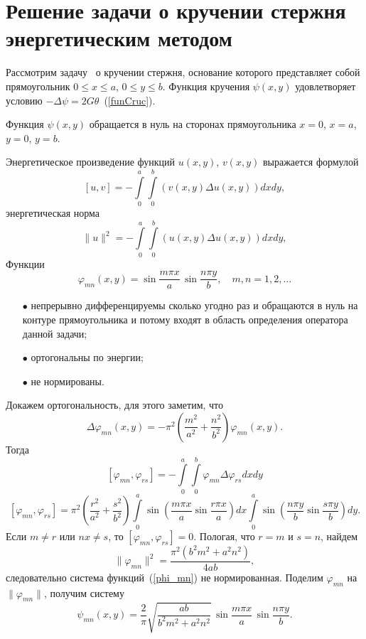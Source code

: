 \documentclass[12pt, a4paper]{article}
\begin{document}
\section{Решение задачи о кручении стержня энергетическим методом}
Рассмотрим задачу~\cite{Michilin} о кручении стержня, основание которого представляет собой   прямоугольник
$0 \leqslant x \leqslant a$, $0 \leqslant y \leqslant b$.
Функция кручения $\psi(x, y)$ удовлетворяет условию $-\Delta \psi = 2 G \theta$~(\ref{funCruc}).

Функция $\psi(x, y)$ обращается в нуль на
сторонах прямоугольника $x= 0$, $x = a$, $y = 0$, $y = b$.

Энергетическое произведение функций $u(x, y)$, $v(x, y)$ выражается формулой
\begin{equation}  
	\label{multUV}
	[\textit{u}, \textit{v}] = - \int\limits_0^a \int\limits_0^b \left(v(x, y) \Delta u(x, y ) \right) dx dy,
\end{equation}
энергетическая норма
\begin{equation}  
	\label{energoNorm}
	\|u\|^2 = - \int\limits_0^a \int\limits_0^b \left(u(x, y) \Delta u(x, y ) \right) dx dy,
\end{equation}
Функции
\begin{equation}  
	\label{phi_mn}
	\varphi_{mn}(x, y) = \sin\frac{m\pi x}{a} \, \sin\frac{n\pi y}{b}, \quad
	m, n = 1, 2, \ldots
\end{equation}

\begin{itemize}
	\item [$\bullet$] непрерывно дифференцируемы сколько угодно раз и
	обращаются в нуль на контуре прямоугольника и потому входят в
	область определения оператора данной задачи;
	\item [$\bullet$] ортогональны по энергии;
	\item [$\bullet$] не нормированы.
\end{itemize}
Докажем ортогональность, для этого заметим, что
\begin{equation}
	\Delta \varphi_{mn}(x, y) = - \pi^2 \left(\frac{m^2}{a^2} + \frac{n^2}{b^2}\right)\varphi_{mn}(x, y).
\end{equation}
Тогда 
\[
	[\varphi_{mn}, \varphi_{rs}] = - \int\limits_0^a \int\limits_0^b \varphi_{mn} \Delta \varphi_{rs} dx dy
\]
\[
  	[\varphi_{mn}, \varphi_{rs}] = \pi^2(\frac{r^2}{a^2} + \frac{s^2}{b^2})
  	\int\limits_0^a \sin \left(\frac{m \pi x}{a} \sin \frac{r \pi x}{a}\right) dx
  	\int\limits_0^a \sin \left(\frac{n \pi y}{b} \sin \frac{s \pi y}{b}\right) dy.
\]
Если $m \neq r$ или $nx \neq s$, то $[\varphi_{mn}, \varphi_{rs}] = 0$. Пологая, что $r = m$ и $s = n$, найдем 
\[
	\| \varphi_{mn} \|^2 = \frac{\pi^2\left(b^2 m^2 + a^2 n^2\right)}{4ab},
\]
следовательно система функций~(\ref{phi_mn}) не нормированная.
Поделим $\varphi_{mn}$ на $\| \varphi_{mn} \|$, получим систему
\begin{equation}  \label{norm_psi_mn}
	\psi_{mn}(x, y) = \frac{2}{\pi} \sqrt{\frac{ab}{b^2 m^2 + a^2 n^2}} \, \sin\frac{m\pi x}{a} \, \sin\frac{n\pi y}{b}.
\end{equation}
\end{document}
